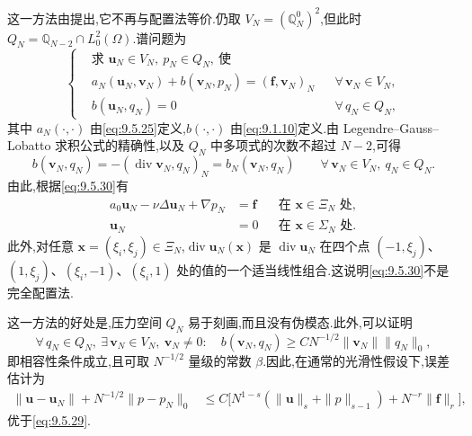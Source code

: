 这一方法由提出,它不再与配置法等价.仍取 \(V_N=(\mathbb Q_N^0)^2\),但此时 \(Q_N=\mathbb Q_{N-2}\cap L_0^2(\Omega)\).谱问题为
\begin{equation}\label{eq:9.5.30}
  \left\{
  \begin{aligned}
    &\text{求 }\boldsymbol{u}_N\in V_N,\ p_N\in Q_N,\ \text{使}\\
    &a_N(\boldsymbol{u}_N,\boldsymbol{v}_N)+b(\boldsymbol{v}_N,p_N)
      =(\boldsymbol{f},\boldsymbol{v}_N)_N &&\forall\,\boldsymbol{v}_N\in V_N,\\
    &b(\boldsymbol{u}_N,q_N)=0&&\forall\,q_N\in Q_N,
  \end{aligned}
  \right.
\end{equation}
其中 \(a_N(\cdot,\cdot)\) 由\eqref{eq:9.5.25}定义,\(b(\cdot,\cdot)\) 由\eqref{eq:9.1.10}定义.由 Legendre--Gauss--Lobatto 求积公式的精确性,以及 \(Q_N\) 中多项式的次数不超过 \(N-2\),可得
\[
  b(\boldsymbol{v}_N,q_N)=-(\operatorname{div}\boldsymbol{v}_N,q_N)_N=b_N(\boldsymbol{v}_N,q_N)
       \qquad\forall\,\boldsymbol{v}_N\in V_N,\ q_N\in Q_N.
\]
由此,根据\eqref{eq:9.5.30}有
\[
  \begin{aligned}
    a_0\boldsymbol{u}_N-\nu\Delta\boldsymbol{u}_N+\nabla p_N&=\boldsymbol{f}
             &&\text{在 }\boldsymbol{x}\in\Xi_N\text{ 处},\\
    \boldsymbol{u}_N&=0&&\text{在 }\boldsymbol{x}\in\Sigma_N\text{ 处}.
  \end{aligned}
\]
此外,对任意 \(\boldsymbol{x}=(\xi_i,\xi_j)\in\Xi_N\),\(\operatorname{div}\boldsymbol{u}_N(\boldsymbol{x})\) 是 \(\operatorname{div}\boldsymbol{u}_N\) 在四个点 \((-1,\xi_j)\)、\((1,\xi_j)\)、\((\xi_i,-1)\)、\((\xi_i,1)\) 处的值的一个适当线性组合.这说明\eqref{eq:9.5.30}不是完全配置法.

这一方法的好处是,压力空间 \(Q_N\) 易于刻画,而且没有伪模态.此外,可以证明
\begin{equation}\label{eq:9.5.31}
  \forall\,q_N\in Q_N,\ \exists\,\boldsymbol{v}_N\in V_N,\ \boldsymbol{v}_N\ne0:\quad
     b(\boldsymbol{v}_N,q_N)\ge CN^{-1/2}\|\boldsymbol{v}_N\|\|q_N\|_0,
\end{equation}
即相容性条件成立,且可取 \(N^{-1/2}\) 量级的常数 \(\beta\).因此,在通常的光滑性假设下,误差估计为
\begin{equation}\label{eq:9.5.32}
  \begin{aligned}
    \|\boldsymbol{u}-\boldsymbol{u}_N\|+N^{-1/2}\|p-p_N\|_0
       &\le C\bigl[N^{1-s}(\|\boldsymbol{u}\|_s+\|p\|_{s-1})
                     +N^{-r}\|\boldsymbol{f}\|_r\bigr],
  \end{aligned}
\end{equation}
优于\eqref{eq:9.5.29}.

